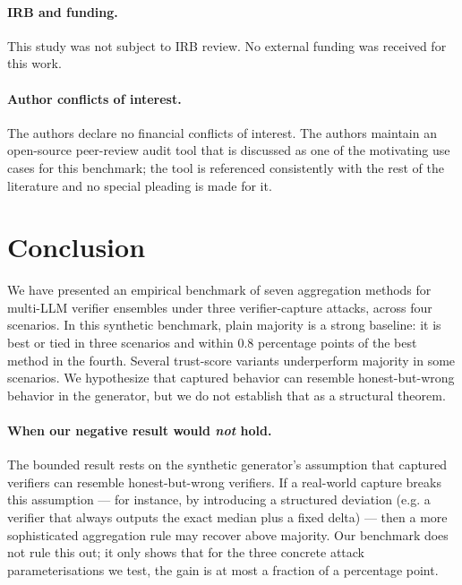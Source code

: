 \documentclass[11pt]{article}
\begin{document}
\paragraph{IRB and funding.}
This study was not subject to IRB review. No external funding was
received for this work.

\paragraph{Author conflicts of interest.}
The authors declare no financial conflicts of interest. The authors
maintain an open-source peer-review audit tool
\citep{liu2026paperreviewtoolkit} that is discussed as one of the
motivating use cases for this benchmark; the tool is referenced
consistently with the rest of the literature and no special pleading
is made for it.

\section{Conclusion}
\label{sec:conclusion}

We have presented an empirical benchmark of seven aggregation methods
for multi-LLM verifier ensembles under three verifier-capture attacks,
across four scenarios. In this synthetic benchmark, plain majority is a
strong baseline: it is best or tied in three scenarios and within 0.8
percentage points of the best method in the fourth. Several trust-score
variants underperform majority in some scenarios. We hypothesize that
captured behavior can resemble honest-but-wrong behavior in the generator,
but we do not establish that as a structural theorem.

\paragraph{When our negative result would \emph{not} hold.}
The bounded result rests on the synthetic generator's assumption that
captured verifiers can resemble honest-but-wrong verifiers. If a real-world capture breaks this
assumption --- for instance, by introducing a structured deviation
(e.g. a verifier that always outputs the exact median plus a fixed
delta) --- then a more sophisticated aggregation rule may recover
above majority. Our benchmark does not rule this out; it only shows
that for the three concrete attack parameterisations we test, the
gain is at most a fraction of a percentage point.
\end{document}
